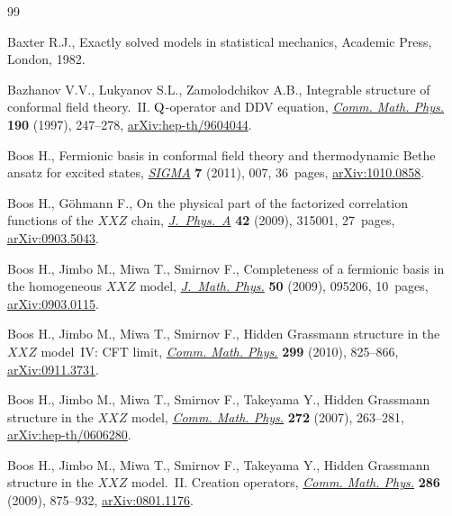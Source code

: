 \documentclass[pdftex]{sigma}
\numberwithin{equation}{section}
\begin{document}
\begin{thebibliography}{99}
\footnotesize\itemsep=0pt

Baxter R.J., Exactly solved models in statistical mechanics, Academic Press,
  London, 1982.

Bazhanov V.V., Lukyanov S.L., Zamolodchikov A.B., Integrable structure of
  conformal field theory.~{II}. {${\rm Q}$}-operator and {DDV} equation,
  \href{https://doi.org/10.1007/s002200050240}{\textit{Comm. Math. Phys.}} \textbf{190} (1997), 247--278,
  \href{https://arxiv.org/abs/hep-th/9604044}{arXiv:hep-th/9604044}.

Boos H., Fermionic basis in conformal field theory and thermodynamic {B}ethe
  ansatz for excited states, \href{https://doi.org/10.3842/SIGMA.2011.007}{\textit{SIGMA}} \textbf{7} (2011), 007, 36~pages,
  \href{https://arxiv.org/abs/1010.0858}{arXiv:1010.0858}.

Boos H., G\"ohmann F., On the physical part of the factorized correlation
  functions of the {$XXZ$} chain, \href{https://doi.org/10.1088/1751-8113/42/31/315001}{\textit{J.~Phys.~A}} \textbf{42} (2009),
  315001, 27~pages, \href{https://arxiv.org/abs/0903.5043}{arXiv:0903.5043}.

Boos H., Jimbo M., Miwa T., Smirnov F., Completeness of a fermionic basis in
  the homogeneous {$XXZ$} model, \href{https://doi.org/10.1063/1.3147206}{\textit{J.~Math. Phys.}} \textbf{50} (2009),
  095206, 10~pages, \href{https://arxiv.org/abs/0903.0115}{arXiv:0903.0115}.

Boos H., Jimbo M., Miwa T., Smirnov F., Hidden {G}rassmann structure in the
  {$XXZ$} model~{IV}: {CFT} limit, \href{https://doi.org/10.1007/s00220-010-1051-6}{\textit{Comm. Math. Phys.}} \textbf{299}
  (2010), 825--866, \href{https://arxiv.org/abs/0911.3731}{arXiv:0911.3731}.

Boos H., Jimbo M., Miwa T., Smirnov F., Takeyama Y., Hidden {G}rassmann
  structure in the {$XXZ$} model, \href{https://doi.org/10.1007/s00220-007-0202-x}{\textit{Comm. Math. Phys.}} \textbf{272}
  (2007), 263--281, \href{https://arxiv.org/abs/hep-th/0606280}{arXiv:hep-th/0606280}.

Boos H., Jimbo M., Miwa T., Smirnov F., Takeyama Y., Hidden {G}rassmann
  structure in the {$XXZ$} model.~{II}. {C}reation operators, \href{https://doi.org/10.1007/s00220-008-0617-z}{\textit{Comm.
  Math. Phys.}} \textbf{286} (2009), 875--932, \href{https://arxiv.org/abs/0801.1176}{arXiv:0801.1176}.


\end{thebibliography}
\end{document}
